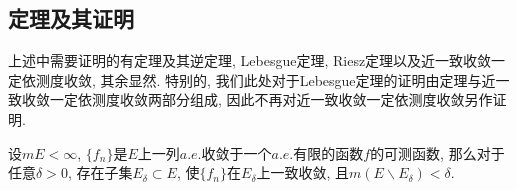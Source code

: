 \vskip 5cm
\subsection{定理及其证明}

上述中需要证明的有\ru{}定理及其逆定理, Lebesgue定理, Riesz定理以及近一致收敛一定依测度收敛, 其余显然. 
特别的, 我们此处对于Lebesgue定理的证明由\ru{}定理与近一致收敛一定依测度收敛两部分组成, 因此不再对近一致收敛一定依测度收敛另作证明.

\vskip 0.2cm
\begin{theorem}\label{thm:Egoroff}
	设$mE < \infty$, $\{ f_n \}$是$E$上一列$a.e.$收敛于一个$a.e.$有限的函数$f$的可测函数, 那么对于任意$\delta > 0$, 存在子集$E_{\delta} \subset E$, 使$\{f_n\}$在$E_{\delta}$上一致收敛, 且$m(E \backslash E_{\delta}) < \delta$.
\end{theorem}

